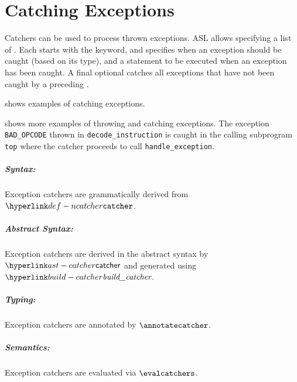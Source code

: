 
\chapter{Catching Exceptions\label{chap:CatchingExceptions}}

Catchers can be used to process thrown exceptions.
ASL allows specifying a list of \emph{\catchersterm{}}.
Each \catcherterm{} starts with the \Twhen{} keyword,
and specifies when an exception
should be caught (based on its type), and a statement to be executed
when an exception has been caught.
A final optional \Totherwise{} \catcherterm{}
catches all exceptions that have not been caught
by a preceding \catcherterm{}.

 shows examples of catching exceptions.

 shows more examples of throwing and catching exceptions.
The exception \verb|BAD_OPCODE| thrown in \verb|decode_instruction| is caught in the calling
subprogram \verb|top| where the catcher proceeds to call \verb|handle_exception|.

\ChapterOutline

\paragraph{Syntax:} Exception catchers are grammatically derived from $\Ncatcher$.
\paragraph{Abstract Syntax:} Exception catchers are derived in the abstract syntax by $\catcher$
  and generated using $\buildcatcher$.
\paragraph{Typing:} Exception catchers are annotated by $\annotatecatcher$.
\paragraph{Semantics:} Exception catchers are evaluated via $\evalcatchers$.

